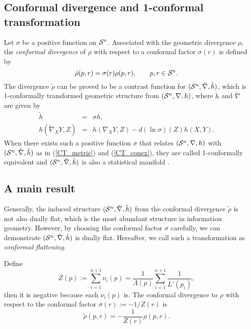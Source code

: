\documentclass{llncs}
\begin{document}
\subsection{Conformal divergence and 1-conformal transformation}
Let $\sigma$ be a positive function on ${\cal S}^n$.
Associated with the geometric divergence $\rho$, 
the {\em conformal divergence} \cite{Kurose94} of $\rho$ 
with respect to a conformal factor 
$\sigma(r)$ is defined by
\begin{equation}
	\tilde \rho(p,r)= \sigma(r) \rho(p,r), \qquad p, r \in {\cal S}^n.
\label{conf_div}
\end{equation}
The divergence $\tilde \rho$ can be proved  
to be a contrast function for $({\cal S}^n,\tilde \nabla, \tilde h)$, 
which is 1-conformally transformed geometric structure 
from $({\cal S}^n,\nabla,h)$,
where $\tilde h$ and $\tilde \nabla$ are given by
\begin{eqnarray}
	\tilde h&=& \sigma h, 
\label{CT_metric} 
\\
	h(\tilde \nabla_X Y, Z)&=& h(\nabla_X Y, Z)-d(\ln \sigma)(Z)h(X,Y).
\label{CT_conex}
\end{eqnarray}
When there exists such a positive function $\sigma$ that relates 
$({\cal S}^n,\nabla,h)$ with $({\cal S}^n,\tilde \nabla, \tilde h)$ as in 
(\ref{CT_metric}) and (\ref{CT_conex}), 
they are called 1-conformally equivalent and 
$({\cal S}^n,\tilde \nabla, \tilde h)$ is also a statistical manifold 
\cite{Kurose94}.

	
\subsection{A main result}

Generally, the induced structure $({\cal S}^n,\tilde \nabla, \tilde h)$ 
from the conformal divergence $\tilde \rho$ 
is not also dually flat, which is 
the most abundant structure in information geometry.
However, by choosing the conformal factor $\sigma$ carefully, 
we can demonstrate $({\cal S}^n,\tilde \nabla, \tilde h)$ is dually flat. 
Hereafter, we call such a transformation as {\em conformal flattening}.

Define
\[
	Z(p):= \sum_{i=1}^{n+1} \nu_i(p)
	=\frac{1}{\Lambda(p)}\sum_{i=1}^{n+1} \frac{1}{L'(p_i)},
\]
then it is negative because each $\nu_i(p)$ is.
The conformal divergence to $\rho$ with respect to the conformal factor 
$\sigma(r):=-1/Z(r)$ is
\[
	\tilde \rho(p,r)= -\frac{1}{Z(r)}\rho(p,r).
\]
%
\end{document}
